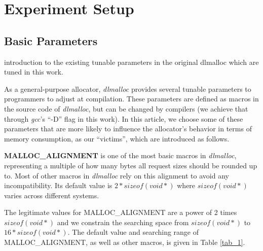 

\section{Experiment Setup}
\subsection{Basic Parameters}
introduction to the existing tunable parameters in the original dlmalloc which are tuned in this work.

As a general-purpose allocator, \emph{dlmalloc} provides several tunable parameters to programmers to adjust at compilation. These parameters are defined as macros in the source code of \emph{dlmalloc}, but can be changed by compilers (we achieve that through \emph{gcc}'s ``-D'' flag in this work). In this article, we choose some of these parameters that are more likely to influence the allocator's behavior in terms of memory consumption, as our ``victims'', which are introduced as follows.

\textbf{MALLOC\_ALIGNMENT} is one of the most basic macros in \emph{dlmalloc}, representing a multiple of how many bytes all request sizes should be rounded up to. Most of other macros in \emph{dlmalloc} rely on this alignment to avoid any incompatibility. Its default value is $2*sizeof(void*)$ where $sizeof(void*)$ varies across different systems. 
\begin{table*}[htbp]
\centering
\caption{\emph{dlmalloc} parameters}
\label{tab_1}
\end{table*}
The legitimate values for MALLOC\_ALIGNMENT are a power of 2 times $sizeof(void*)$ and we constrain the searching space from $sizeof(void*)$ to $16*sizeof(void*)$. The default value and searching range of MALLOC\_ALIGNMENT, as well as other macros, is given in Table \ref{tab_1}.

